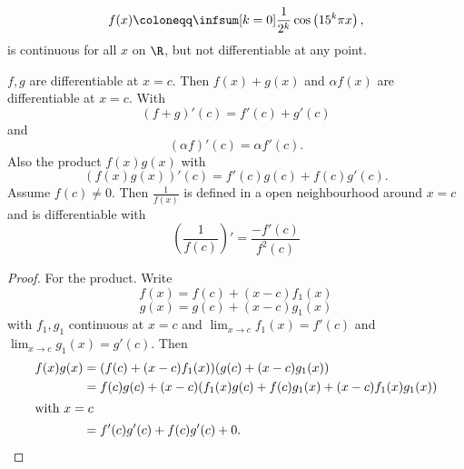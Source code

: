 \documentclass[10pt, a4paper]{article}
\begin{document}
\[
f(x) \coloneqq \infsum[k = 0]\frac{1}{2 ^ k}\cos\left(15 ^ k\pi x\right),
\]
is continuous for all $x$ on $\R$,
but not differentiable at any point.

\begin{theorem}
    $f, g$ are differentiable at $x = c$.
    Then $f(x) + g(x)$ and $\alpha f(x)$ are differentiable at $x = c$.
    With
    \[
    (f + g)'(c) = f'(c) + g'(c)
    \]
    and
    \[
    (\alpha f)'(c) = \alpha f'(c).
    \]
    Also the product $f(x)g(x)$ with
    \[
    (f(x)g(x))'(c) = f'(c)g(c) + f(c)g'(c).
    \]
    Assume $f(c) \neq 0$.
    Then $\frac{1}{f(x)}$ is defined in a open neighbourhood around $x = c$ and is differentiable with
    \[
    \left(\frac{1}{f(c)}\right)' = \frac{-f'(c)}{f ^ 2(c)}
    \]
    
    \begin{proof}
        For the product.
        Write
        \[
        f(x) = f(c) + (x - c)f_1(x)
        \]
        \[
        g(x) = g(c) + (x - c)g_1(x)
        \]
        with $f_1, g_1$ continuous at $x = c$ and $\lim_{x \to c}f_1(x) = f'(c)$ and $\lim_{x \to c}g_1(x) = g'(c)$.
        Then
        \begin{align*}
            f(x)g(x) &= (f(c) + (x - c)f_1(x))(g(c) + (x - c)g_1(x)) \\
            &= f(c)g(c) + (x - c)(f_1(x)g(c) + f(c)g_1(x) + (x - c)f_1(x)g_1(x)) \\
            \intertext{with $x = c$}
            &= f'(c)g'(c) + f(c)g'(c) + 0.
        \end{align*}
        \[
        \]
    \end{proof}
\end{theorem}
\end{document}
